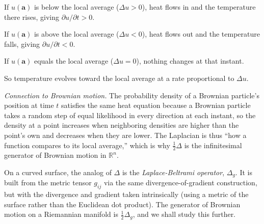 \documentclass{article}
\begin{document}
If $u(\mathbf{a})$ is below the local average ($\Delta u > 0$), heat flows in and the temperature there rises, giving $\partial u / \partial t > 0$.
 
If $u(\mathbf{a})$ is above the local average ($\Delta u < 0$), heat flows out and the temperature falls, giving $\partial u / \partial t < 0$.
 
If $u(\mathbf{a})$ equals the local average ($\Delta u = 0$), nothing changes at that instant.
 
So temperature evolves toward the local average at a rate proportional to $\Delta u$.
 
\textit{Connection to Brownian motion.} The probability density of a Brownian particle's position at time $t$ satisfies the same heat equation because a Brownian particle takes a random step of equal likelihood in every direction at each instant, so the density at a point increases when neighboring densities are higher than the point's own and decreases when they are lower. The Laplacian is thus ``how a function compares to its local average,'' which is why $\tfrac{1}{2}\Delta$ is the infinitesimal generator of Brownian motion in $\mathbb{R}^n$.
 
On a curved surface, the analog of $\Delta$ is the \textit{Laplace-Beltrami operator}, $\Delta_g$. It is built from the metric tensor $g_{ij}$ via the same divergence-of-gradient construction, but with the divergence and gradient taken intrinsically (using a metric of the surface rather than the Euclidean dot product). The generator of Brownian motion on a Riemannian manifold is $\tfrac{1}{2}\Delta_g$,  and we shall study this further.
\end{document}
